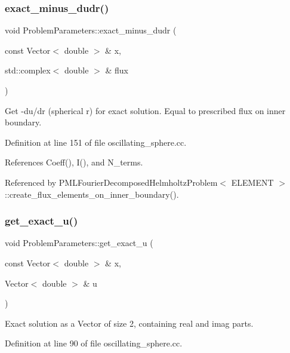 \subsubsection{\texorpdfstring{exact\+\_\+minus\+\_\+dudr()}{exact\_minus\_dudr()}}
{\footnotesize\ttfamily void Problem\+Parameters\+::exact\+\_\+minus\+\_\+dudr (\begin{DoxyParamCaption}\item[{const Vector$<$ double $>$ \&}]{x,  }\item[{std\+::complex$<$ double $>$ \&}]{flux }\end{DoxyParamCaption})}



Get -\/du/dr (spherical r) for exact solution. Equal to prescribed flux on inner boundary. 



Definition at line 151 of file oscillating\+\_\+sphere.\+cc.



References Coeff(), I(), and N\+\_\+terms.



Referenced by P\+M\+L\+Fourier\+Decomposed\+Helmholtz\+Problem$<$ E\+L\+E\+M\+E\+N\+T $>$\+::create\+\_\+flux\+\_\+elements\+\_\+on\+\_\+inner\+\_\+boundary().

\mbox{\label{namespaceProblemParameters_af750b29069b29bd38b5220ecf534e7f7}} 
\subsubsection{\texorpdfstring{get\+\_\+exact\+\_\+u()}{get\_exact\_u()}}
{\footnotesize\ttfamily void Problem\+Parameters\+::get\+\_\+exact\+\_\+u (\begin{DoxyParamCaption}\item[{const Vector$<$ double $>$ \&}]{x,  }\item[{Vector$<$ double $>$ \&}]{u }\end{DoxyParamCaption})}



Exact solution as a Vector of size 2, containing real and imag parts. 



Definition at line 90 of file oscillating\+\_\+sphere.\+cc.



